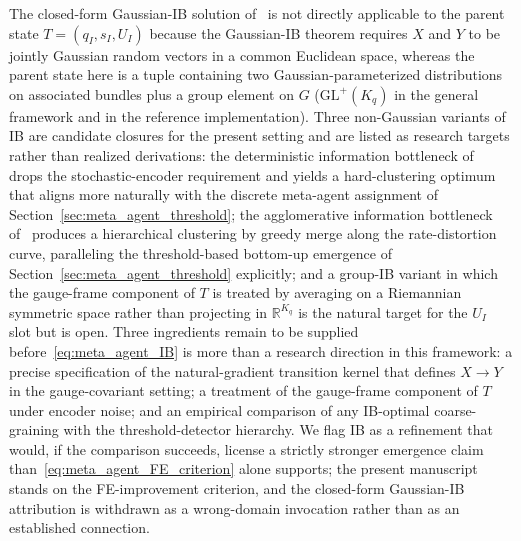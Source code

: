 \documentclass[11pt]{article}
\begin{document}
The closed-form Gaussian-IB solution of~\cite{chechik2005information} is not directly applicable to the parent state $T = (q_I, s_I, U_I)$ because the Gaussian-IB theorem requires $X$ and $Y$ to be jointly Gaussian random vectors in a common Euclidean space, whereas the parent state here is a tuple containing two Gaussian-parameterized distributions on associated bundles plus a group element on $G$ ($\mathrm{GL}^+(K_q)$ in the general framework and in the reference implementation). Three non-Gaussian variants of IB are candidate closures for the present setting and are listed as research targets rather than realized derivations: the deterministic information bottleneck of~\cite{StrouseSchwab2017} drops the stochastic-encoder requirement and yields a hard-clustering optimum that aligns more naturally with the discrete meta-agent assignment of Section~\ref{sec:meta_agent_threshold}; the agglomerative information bottleneck of~\cite{SlonimTishby2000} produces a hierarchical clustering by greedy merge along the rate-distortion curve, paralleling the threshold-based bottom-up emergence of Section~\ref{sec:meta_agent_threshold} explicitly; and a group-IB variant in which the gauge-frame component of $T$ is treated by averaging on a Riemannian symmetric space rather than projecting in $\mathbb{R}^{K_q}$ is the natural target for the $U_I$ slot but is open. Three ingredients remain to be supplied before~\eqref{eq:meta_agent_IB} is more than a research direction in this framework: a precise specification of the natural-gradient transition kernel that defines $X \to Y$ in the gauge-covariant setting; a treatment of the gauge-frame component of $T$ under encoder noise; and an empirical comparison of any IB-optimal coarse-graining with the threshold-detector hierarchy. We flag IB as a refinement that would, if the comparison succeeds, license a strictly stronger emergence claim than~\eqref{eq:meta_agent_FE_criterion} alone supports; the present manuscript stands on the FE-improvement criterion, and the closed-form Gaussian-IB attribution is withdrawn as a wrong-domain invocation rather than as an established connection.
\end{document}
